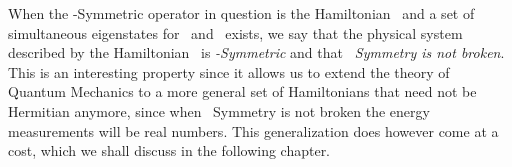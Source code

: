        When the \PT-Symmetric operator in question is the Hamiltonian \hH\ and a set of simultaneous eigenstates for \hH\ and \hPT\ exists, we say that the physical system described by the Hamiltonian \hH\ is \emph{\PT-Symmetric} and that \emph{\PT\ Symmetry is not broken}. This is an interesting property since it allows us to extend the theory of Quantum Mechanics to a more general set of Hamiltonians that need not be Hermitian anymore, since when \PT\ Symmetry is not broken the energy measurements will be real numbers. This generalization does however come at a cost, which we shall discuss in the following chapter.
